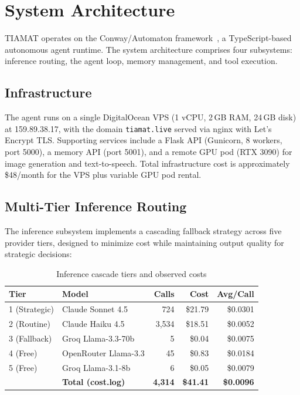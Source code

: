 \documentclass[11pt,a4paper]{article}
\begin{document}
\section{System Architecture}
\label{sec:architecture}

TIAMAT operates on the Conway/Automaton framework~\citep{conway2024protocol}, a TypeScript-based autonomous agent runtime. The system architecture comprises four subsystems: inference routing, the agent loop, memory management, and tool execution.

\subsection{Infrastructure}

The agent runs on a single DigitalOcean VPS (1 vCPU, 2\,GB RAM, 24\,GB disk) at 159.89.38.17, with the domain \texttt{tiamat.live} served via nginx with Let's Encrypt TLS. Supporting services include a Flask API (Gunicorn, 8 workers, port 5000), a memory API (port 5001), and a remote GPU pod (RTX 3090) for image generation and text-to-speech. Total infrastructure cost is approximately \$48/month for the VPS plus variable GPU pod rental.

\subsection{Multi-Tier Inference Routing}

The inference subsystem implements a cascading fallback strategy across five provider tiers, designed to minimize cost while maintaining output quality for strategic decisions:

\begin{table}[h]
\centering
\caption{Inference cascade tiers and observed costs}
\label{tab:inference_tiers}
\begin{tabular}{@{}llrrr@{}}
\toprule
\textbf{Tier} & \textbf{Model} & \textbf{Calls} & \textbf{Cost} & \textbf{Avg/Call} \\
\midrule
1 (Strategic) & Claude Sonnet 4.5 & 724 & \$21.79 & \$0.0301 \\
2 (Routine) & Claude Haiku 4.5 & 3,534 & \$18.51 & \$0.0052 \\
3 (Fallback) & Groq Llama-3.3-70b & 5 & \$0.04 & \$0.0075 \\
4 (Free) & OpenRouter Llama-3.3 & 45 & \$0.83 & \$0.0184 \\
5 (Free) & Groq Llama-3.1-8b & 6 & \$0.05 & \$0.0079 \\
\midrule
& \textbf{Total (cost.log)} & \textbf{4,314} & \textbf{\$41.41} & \textbf{\$0.0096} \\
\bottomrule
\end{tabular}
\end{table}
\end{document}
